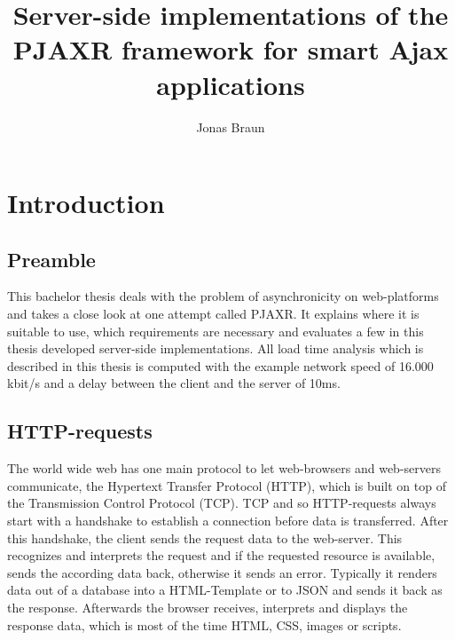\documentclass[f,bachelor,binding,twoside,palatino]{WeSTthesis}
\author{Jonas Braun}
\title{Server-side implementations of the PJAXR framework for smart Ajax applications}
\def \pjaxr {PJAXR}
\def \httpRequests {HTTP-requests}
\begin{document}

\maketitle %

\tableofcontents

\varclearpage



\section{Introduction}
  \subsection{Preamble}
  This bachelor thesis deals with the problem of asynchronicity on web-platforms and takes a close look at one attempt called \pjaxr{}.
  It explains where it is suitable to use, which requirements are necessary and evaluates a few in this thesis developed server-side implementations.
  All load time analysis which is described in this thesis is computed with the example network speed of 16.000 kbit/s and a delay between the client and the server of 10ms.
  

  \subsection{\httpRequests{}}
    The world wide web has one main protocol to let web-browsers and web-servers communicate, the Hypertext Transfer Protocol (HTTP), which is built on top of the Transmission Control Protocol (TCP).
    TCP and so \httpRequests{} always start with a handshake to establish a connection before data is transferred.
    After this handshake, the client sends the request data to the web-server.
    This recognizes and interprets the request and if the requested resource is available, sends the according data back, otherwise it sends an error.
    Typically it renders data out of a database into a HTML-Template or to JSON and sends it back as the response.
	Afterwards the browser receives, interprets and displays the response data, which is most of the time HTML, CSS, images or scripts.
\end{document}
